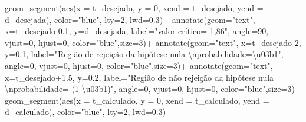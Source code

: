 \documentclass[
]{book}
\newenvironment{Shaded}{\begin{snugshade}}{\end{snugshade}}
\newcommand{\AttributeTok}[1]{\textcolor[rgb]{0.77,0.63,0.00}{#1}}
\newcommand{\DecValTok}[1]{\textcolor[rgb]{0.00,0.00,0.81}{#1}}
\newcommand{\FloatTok}[1]{\textcolor[rgb]{0.00,0.00,0.81}{#1}}
\newcommand{\FunctionTok}[1]{\textcolor[rgb]{0.00,0.00,0.00}{#1}}
\newcommand{\NormalTok}[1]{#1}
\newcommand{\SpecialCharTok}[1]{\textcolor[rgb]{0.00,0.00,0.00}{#1}}
\newcommand{\StringTok}[1]{\textcolor[rgb]{0.31,0.60,0.02}{#1}}
\begin{document}
\begin{Shaded}
\begin{Highlighting}[]
  \FunctionTok{geom\_segment}\NormalTok{(}\FunctionTok{aes}\NormalTok{(}\AttributeTok{x =}\NormalTok{ t\_desejado, }\AttributeTok{y =} \DecValTok{0}\NormalTok{, }\AttributeTok{xend =}\NormalTok{ t\_desejado, }\AttributeTok{yend =}\NormalTok{ d\_desejada), }\AttributeTok{color=}\StringTok{"blue"}\NormalTok{, }\AttributeTok{lty=}\DecValTok{2}\NormalTok{, }\AttributeTok{lwd=}\FloatTok{0.3}\NormalTok{)}\SpecialCharTok{+}
 \FunctionTok{annotate}\NormalTok{(}\AttributeTok{geom=}\StringTok{"text"}\NormalTok{, }\AttributeTok{x=}\NormalTok{t\_desejado}\FloatTok{{-}0.1}\NormalTok{, }\AttributeTok{y=}\NormalTok{d\_desejada, }\AttributeTok{label=}\StringTok{"valor crítico={-}1,86"}\NormalTok{, }\AttributeTok{angle=}\DecValTok{90}\NormalTok{, }\AttributeTok{vjust=}\DecValTok{0}\NormalTok{, }\AttributeTok{hjust=}\DecValTok{0}\NormalTok{, }\AttributeTok{color=}\StringTok{"blue"}\NormalTok{,}\AttributeTok{size=}\DecValTok{3}\NormalTok{)}\SpecialCharTok{+}
  \FunctionTok{annotate}\NormalTok{(}\AttributeTok{geom=}\StringTok{"text"}\NormalTok{, }\AttributeTok{x=}\NormalTok{t\_desejado}\DecValTok{{-}2}\NormalTok{, }\AttributeTok{y=}\FloatTok{0.1}\NormalTok{, }\AttributeTok{label=}\StringTok{"Região de rejeição da hipótese nula }\SpecialCharTok{\textbackslash{}n}\StringTok{probabilidade=\textbackslash{}u03b1"}\NormalTok{, }\AttributeTok{angle=}\DecValTok{0}\NormalTok{, }\AttributeTok{vjust=}\DecValTok{0}\NormalTok{, }\AttributeTok{hjust=}\DecValTok{0}\NormalTok{, }\AttributeTok{color=}\StringTok{"blue"}\NormalTok{,}\AttributeTok{size=}\DecValTok{3}\NormalTok{)}\SpecialCharTok{+}
 \FunctionTok{annotate}\NormalTok{(}\AttributeTok{geom=}\StringTok{"text"}\NormalTok{, }\AttributeTok{x=}\NormalTok{t\_desejado}\FloatTok{+1.5}\NormalTok{, }\AttributeTok{y=}\FloatTok{0.2}\NormalTok{, }\AttributeTok{label=}\StringTok{"Região de não rejeição da hipótese nula }\SpecialCharTok{\textbackslash{}n}\StringTok{probabilidade= (1{-}\textbackslash{}u03b1)"}\NormalTok{, }\AttributeTok{angle=}\DecValTok{0}\NormalTok{, }\AttributeTok{vjust=}\DecValTok{0}\NormalTok{, }\AttributeTok{hjust=}\DecValTok{0}\NormalTok{, }\AttributeTok{color=}\StringTok{"blue"}\NormalTok{,}\AttributeTok{size=}\DecValTok{3}\NormalTok{)}\SpecialCharTok{+}
 \FunctionTok{geom\_segment}\NormalTok{(}\FunctionTok{aes}\NormalTok{(}\AttributeTok{x =}\NormalTok{ t\_calculado, }\AttributeTok{y =} \DecValTok{0}\NormalTok{, }\AttributeTok{xend =}\NormalTok{ t\_calculado, }\AttributeTok{yend =}\NormalTok{ d\_calculado), }\AttributeTok{color=}\StringTok{"blue"}\NormalTok{, }\AttributeTok{lty=}\DecValTok{2}\NormalTok{, }\AttributeTok{lwd=}\FloatTok{0.3}\NormalTok{)}\SpecialCharTok{+}

\end{Highlighting}
\end{Shaded}
\end{document}

